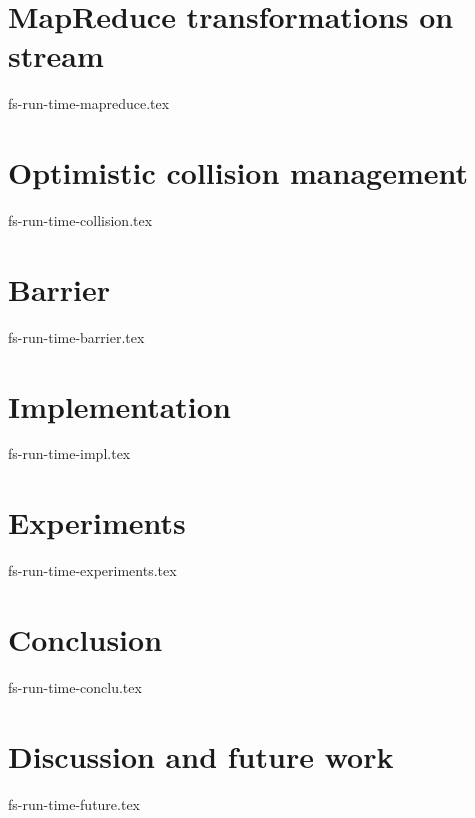 \documentclass[sigconf]{acmart-edbt2018}
\theoremstyle{remark}
\begin{document}
\section {MapReduce transformations on stream}
 {fs-run-time-mapreduce.tex}

\section {Optimistic collision management}
 {fs-run-time-collision.tex}

\section {Barrier}
 {fs-run-time-barrier.tex}

\section {Implementation}
 {fs-run-time-impl.tex}

\section {Experiments}
 {fs-run-time-experiments.tex}

\section {Conclusion}
 {fs-run-time-conclu.tex}

\section {Discussion and future work}
 {fs-run-time-future.tex}



\end{document}
